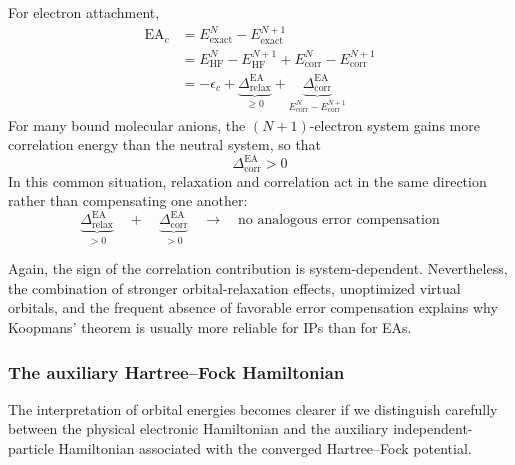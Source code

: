 \documentclass[11pt,a4paper,titlepage]{article}
\numberwithin{equation}{section}
\begin{document}
For electron attachment,
\begin{equation}
\begin{split}
  \text{EA}_c
  &=
  E_\text{exact}^{N}
  -
  E_\text{exact}^{N+1}
  \\
  &=
  E_\text{HF}^{N}
  -
  E_\text{HF}^{N+1}
  +
  E_\text{corr}^{N}
  -
  E_\text{corr}^{N+1}
  \\
  &=\boxed{
  -\epsilon_c
  +
  \underbrace{
    \Delta_\text{relax}^\text{EA}
  }_{\geq0}
  +
  \underbrace{
    \Delta_\text{corr}^\text{EA}
  }_{
    E_\text{corr}^{N}-E_\text{corr}^{N+1}
  }
  }
  \label{eq:koopmans-ea-corrections}
\end{split}
\end{equation}
For many bound molecular anions, the $(N+1)$-electron system gains more
correlation energy than the neutral system, so that
\begin{equation}
  \Delta_\text{corr}^\text{EA}>0
\end{equation}
In this common situation, relaxation and correlation act in the same
direction rather than compensating one another:
\begin{equation}
  \underbrace{\Delta_\text{relax}^\text{EA}}_{>0}
  \quad+\quad
  \underbrace{\Delta_\text{corr}^\text{EA}}_{>0}
  \quad\longrightarrow\quad
  \text{no analogous error compensation}
\end{equation}

Again, the sign of the correlation contribution is system-dependent.
Nevertheless, the combination of stronger orbital-relaxation effects,
unoptimized virtual orbitals, and the frequent absence of favorable error
compensation explains why Koopmans' theorem is usually more reliable 
for IPs than for EAs.


\subsubsection{The auxiliary Hartree--Fock Hamiltonian}

The interpretation of orbital energies becomes clearer if we distinguish
carefully between the physical electronic Hamiltonian and the auxiliary
independent-particle Hamiltonian associated with the converged Hartree--Fock
potential.
\end{document}

